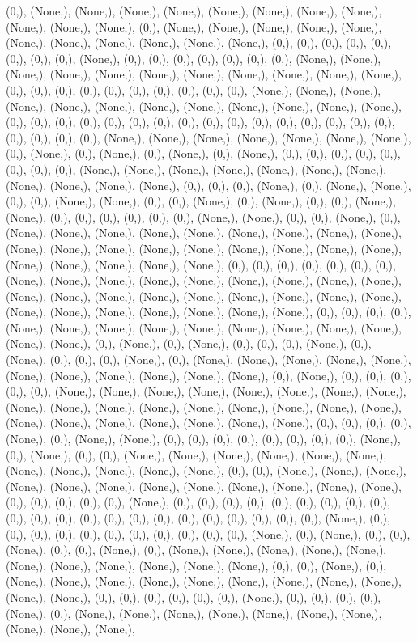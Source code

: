 \documentclass{article}
\begin{document}
(0,), (None,), (None,), (None,), (None,), (None,), (None,), (None,), (None,), (None,), (None,), (None,), (0,), (None,), (None,), (None,), (None,), (None,), (None,), (None,), (None,), (None,), (None,), (None,), (0,), (0,), (0,), (0,), (0,), (0,), (0,), (0,), (None,), (0,), (0,), (0,), (0,), (0,), (0,), (0,), (None,), (None,), (None,), (None,), (None,), (None,), (None,), (None,), (None,), (None,), (None,), (0,), (0,), (0,), (0,), (0,), (0,), (0,), (0,), (0,), (0,), (None,), (None,), (None,), (None,), (None,), (None,), (None,), (None,), (None,), (None,), (None,), (None,), (0,), (0,), (0,), (0,), (0,), (0,), (0,), (0,), (0,), (0,), (0,), (0,), (0,), (0,), (0,), (0,), (0,), (0,), (0,), (0,), (None,), (None,), (None,), (None,), (None,), (None,), (None,), (0,), (None,), (0,), (None,), (0,), (None,), (0,), (None,), (0,), (0,), (0,), (0,), (0,), (0,), (0,), (0,), (None,), (None,), (None,), (None,), (None,), (None,), (None,), (None,), (None,), (None,), (None,), (0,), (0,), (0,), (None,), (0,), (None,), (None,), (0,), (0,), (None,), (None,), (0,), (0,), (None,), (0,), (None,), (0,), (0,), (None,), (None,), (0,), (0,), (0,), (0,), (0,), (0,), (None,), (None,), (0,), (0,), (None,), (0,), (None,), (None,), (None,), (None,), (None,), (None,), (None,), (None,), (None,), (None,), (None,), (None,), (None,), (None,), (None,), (None,), (None,), (None,), (None,), (None,), (None,), (None,), (None,), (0,), (0,), (0,), (0,), (0,), (0,), (0,), (None,), (None,), (None,), (None,), (None,), (None,), (None,), (None,), (None,), (None,), (None,), (None,), (None,), (None,), (None,), (None,), (None,), (None,), (None,), (None,), (None,), (None,), (None,), (None,), (None,), (0,), (0,), (0,), (0,), (None,), (None,), (None,), (None,), (None,), (None,), (None,), (None,), (None,), (None,), (None,), (0,), (None,), (0,), (None,), (0,), (0,), (0,), (None,), (0,), (None,), (0,), (0,), (0,), (None,), (0,), (None,), (None,), (None,), (None,), (None,), (None,), (None,), (None,), (None,), (None,), (None,), (0,), (None,), (0,), (0,), (0,), (0,), (0,), (None,), (None,), (None,), (None,), (None,), (None,), (None,), (None,), (None,), (None,), (None,), (None,), (None,), (None,), (None,), (None,), (None,), (None,), (None,), (None,), (None,), (None,), (None,), (None,), (0,), (0,), (0,), (0,), (None,), (0,), (None,), (None,), (0,), (0,), (0,), (0,), (0,), (0,), (0,), (0,), (None,), (0,), (None,), (0,), (0,), (None,), (None,), (None,), (None,), (None,), (None,), (None,), (None,), (None,), (None,), (None,), (0,), (0,), (None,), (None,), (None,), (None,), (None,), (None,), (None,), (None,), (None,), (None,), (None,), (None,), (0,), (0,), (0,), (0,), (0,), (None,), (0,), (0,), (0,), (0,), (0,), (0,), (0,), (0,), (0,), (0,), (0,), (0,), (0,), (0,), (0,), (0,), (0,), (0,), (0,), (0,), (0,), (0,), (None,), (0,), (0,), (0,), (0,), (0,), (0,), (0,), (0,), (0,), (0,), (0,), (None,), (0,), (None,), (0,), (0,), (None,), (0,), (0,), (None,), (0,), (None,), (None,), (None,), (None,), (None,), (None,), (None,), (None,), (None,), (None,), (None,), (0,), (0,), (None,), (0,), (None,), (None,), (None,), (None,), (None,), (None,), (None,), (None,), (None,), (None,), (None,), (0,), (0,), (0,), (0,), (0,), (0,), (None,), (0,), (0,), (0,), (0,), (None,), (0,), (None,), (None,), (None,), (None,), (None,), (None,), (None,), (None,), (None,), (None,), 
\end{document}
